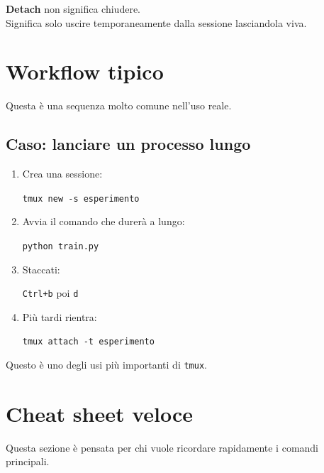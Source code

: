 \documentclass[a4paper,11pt]{article}
\begin{document}
\begin{infobox}
\textbf{Detach} non significa chiudere. \\
Significa solo uscire temporaneamente dalla sessione lasciandola viva.
\end{infobox}

\section{Workflow tipico}
Questa è una sequenza molto comune nell'uso reale.

\subsection{Caso: lanciare un processo lungo}
\begin{enumerate}[leftmargin=1.2cm]
    \item Crea una sessione:
\begin{codebox}
\texttt{tmux new -s esperimento}
\end{codebox}

    \item Avvia il comando che durerà a lungo:
\begin{codebox}
\texttt{python train.py}
\end{codebox}

    \item Staccati:
\begin{codebox}
\texttt{Ctrl+b} poi \texttt{d}
\end{codebox}

    \item Più tardi rientra:
\begin{codebox}
\texttt{tmux attach -t esperimento}
\end{codebox}
\end{enumerate}

Questo è uno degli usi più importanti di \texttt{tmux}.

\section{Cheat sheet veloce}
Questa sezione è pensata per chi vuole ricordare rapidamente i comandi principali.
\end{document}
